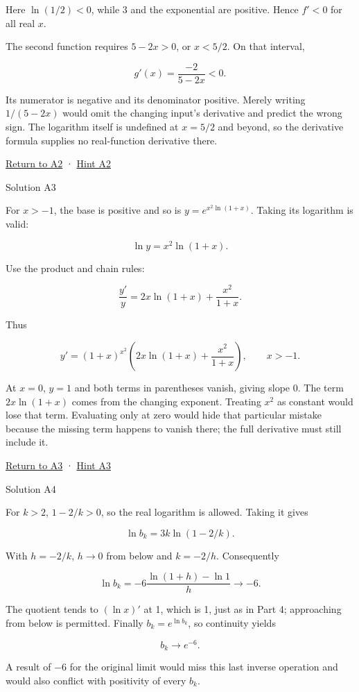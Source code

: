 \documentclass[
  11pt,
]{article}
\begin{document}
Here \(\ln(1/2)<0\), while 3 and the exponential are positive. Hence
\(f'<0\) for all real \(x\).

The second function requires \(5-2x>0\), or \(x<5/2\). On that interval,

\[
g'(x)=\frac{-2}{5-2x}<0.
\]

Its numerator is negative and its denominator positive. Merely writing
\(1/(5-2x)\) would omit the changing input's derivative and predict the
wrong sign. The logarithm itself is undefined at \(x=5/2\) and beyond,
so the derivative formula supplies no real-function derivative there.

\protect\hyperlink{task-a2}{Return to A2} ·
\protect\hyperlink{hint-a2}{Hint A2}

Solution A3

For \(x>-1\), the base is positive and so is \(y=e^{x^2\ln(1+x)}\).
Taking its logarithm is valid:

\[
\ln y=x^2\ln(1+x).
\]

Use the product and chain rules:

\[
\frac{y'}y=2x\ln(1+x)+\frac{x^2}{1+x}.
\]

Thus

\[
y'=(1+x)^{x^2}\left(2x\ln(1+x)+\frac{x^2}{1+x}\right),\qquad x>-1.
\]

At \(x=0\), \(y=1\) and both terms in parentheses vanish, giving slope
0. The term \(2x\ln(1+x)\) comes from the changing exponent. Treating
\(x^2\) as constant would lose that term. Evaluating only at zero would
hide that particular mistake because the missing term happens to vanish
there; the full derivative must still include it.

\protect\hyperlink{task-a3}{Return to A3} ·
\protect\hyperlink{hint-a3}{Hint A3}

Solution A4

For \(k>2\), \(1-2/k>0\), so the real logarithm is allowed. Taking it
gives

\[
\ln b_k=3k\ln(1-2/k).
\]

With \(h=-2/k\), \(h\to0\) from below and \(k=-2/h\). Consequently

\[
\ln b_k=-6\frac{\ln(1+h)-\ln1}{h}\longrightarrow-6.
\]

The quotient tends to \((\ln x)'\) at 1, which is 1, just as in Part 4;
approaching from below is permitted. Finally \(b_k=e^{\ln b_k}\), so
continuity yields

\[
b_k\longrightarrow e^{-6}.
\]

A result of \(-6\) for the original limit would miss this last inverse
operation and would also conflict with positivity of every \(b_k\).
\end{document}
